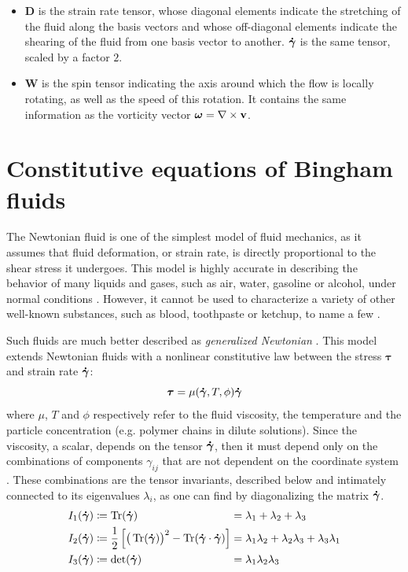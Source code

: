 \documentclass[11 pt]{report}
\begin{document}
\begin{itemize}[label=---]
    \item $\mathbf{D}$ is the strain rate tensor, whose diagonal elements indicate the stretching of the fluid along the basis vectors and whose off-diagonal elements indicate the shearing of the fluid from one basis vector to another. $\boldsymbol{\dot \gamma}$ is the same tensor, scaled by a factor $2$.
    \item $\mathbf{W}$ is the spin tensor indicating the axis around which the flow is locally rotating, as well as the speed of this rotation. It contains the same information as the vorticity vector $\boldsymbol\omega = \nabla \times \mathbf{v}$.
\end{itemize} 

\section{Constitutive equations of Bingham fluids}

The Newtonian fluid is one of the simplest model of fluid mechanics, as it assumes that fluid deformation, or strain rate, is directly proportional to the shear stress it undergoes. This model is highly accurate in describing the behavior of many liquids and gases, such as air, water, gasoline or alcohol, under normal conditions \cite{fox2020fox}. However, it cannot be used to characterize a variety of other well-known substances, such as blood, toothpaste or ketchup, to name a few \cite{Coussot,Geophysical}.

Such fluids are much better described as \textit{generalized Newtonian} \cite{Geophysical}. This model extends Newtonian fluids with a nonlinear constitutive law between the stress $\boldsymbol\tau$ and strain rate $\boldsymbol{\dot \gamma}$:
\begin{equation}
    \boldsymbol\tau = \mu(\boldsymbol{\dot \gamma}, T, \phi) \boldsymbol{\dot \gamma}
    \label{eq:power-law}
\end{equation}
where $\mu$, $T$ and $\phi$ respectively refer to the fluid viscosity, the temperature and the particle concentration (e.g. polymer chains in dilute solutions). Since the viscosity, a scalar, depends on the tensor $\boldsymbol{\dot \gamma}$, then it must depend only on the combinations of components $\gamma_{ij}$ that are not dependent on the coordinate system \cite{bird1987dynamics}. These combinations are the tensor invariants, described below and intimately connected to its eigenvalues $\lambda_i$, as one can find by diagonalizing the matrix $\boldsymbol{\dot \gamma}$.
\begin{equation}
    \begin{alignedat}{2}
        I_1(\boldsymbol{\dot \gamma}) &\coloneqq \Tr(\boldsymbol{\dot \gamma}) &&= \lambda_1 + \lambda_2 + \lambda_3\\
        I_2(\boldsymbol{\dot \gamma}) &\coloneqq \frac{1}{2} \left[\big(\Tr(\boldsymbol{\dot \gamma})\big)^2 - \Tr(\boldsymbol{\dot \gamma} \cdot \boldsymbol{\dot \gamma})\right] &&= \lambda_1\lambda_2 + \lambda_2\lambda_3 + \lambda_3\lambda_1\\
        I_3(\boldsymbol{\dot \gamma}) &\coloneqq \det(\boldsymbol{\dot \gamma}) &&= \lambda_1\lambda_2\lambda_3
    \end{alignedat}
\end{equation}
\end{document}
